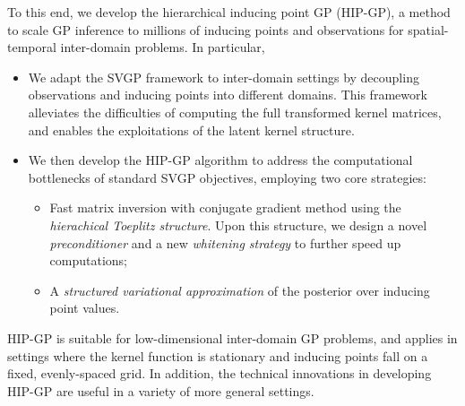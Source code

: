 To this end, we develop the hierarchical inducing point GP (HIP-GP),
a method to scale GP inference
to millions of inducing points and observations for spatial-temporal inter-domain problems.
In particular,
\begin{itemize}
  \item We adapt the SVGP framework to inter-domain settings
  by decoupling observations and inducing points into different domains.
  This framework alleviates the difficulties of computing the full transformed kernel matrices,
  and enables the exploitations of the latent kernel structure.
  \item We then develop the HIP-GP algorithm to address the computational bottlenecks
   of standard SVGP objectives, employing two core strategies:
   \begin{itemize}
     \item  Fast matrix inversion with conjugate gradient method
     using the \emph{hierachical Toeplitz structure}.
      Upon this structure, we design a novel \emph{preconditioner}
     and a new \emph{whitening strategy} to further speed up computations;
    \item A \emph{structured variational approximation} of
    the posterior over inducing point values.
  \end{itemize}
\end{itemize}
HIP-GP is suitable for low-dimensional inter-domain GP problems,  and applies in
settings where the kernel function is stationary and inducing points fall on a fixed, evenly-spaced grid.
In addition, the technical innovations in developing HIP-GP
are useful in a variety of more general settings.



